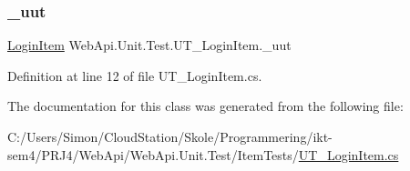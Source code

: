 \subsubsection{\texorpdfstring{\+\_\+uut}{\_uut}}
{\footnotesize\ttfamily \mbox{\hyperlink{class_f_w_p_s_1_1_models_1_1_login_item}{Login\+Item}} Web\+Api.\+Unit.\+Test.\+U\+T\+\_\+\+Login\+Item.\+\_\+uut\hspace{0.3cm}{\ttfamily [private]}}



Definition at line 12 of file U\+T\+\_\+\+Login\+Item.\+cs.



The documentation for this class was generated from the following file\+:\begin{DoxyCompactItemize}
\item 
C\+:/\+Users/\+Simon/\+Cloud\+Station/\+Skole/\+Programmering/ikt-\/sem4/\+P\+R\+J4/\+Web\+Api/\+Web\+Api.\+Unit.\+Test/\+Item\+Tests/\mbox{\hyperlink{_u_t___login_item_8cs}{U\+T\+\_\+\+Login\+Item.\+cs}}\end{DoxyCompactItemize}
